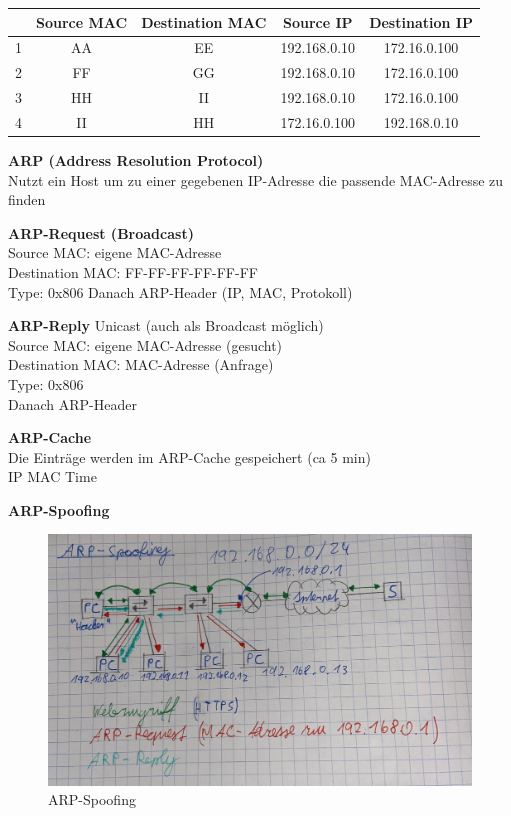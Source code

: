 \begin{table}[H]
	\begin{tabular}{c|cccc}
		& Source MAC & Destination MAC & Source IP & Destination IP \\
		\hline
		1 & AA & EE & 192.168.0.10 & 172.16.0.100 \\
		2 & FF & GG & 192.168.0.10 & 172.16.0.100 \\
		3 & HH & II & 192.168.0.10 & 172.16.0.100 \\
		4 & II & HH & 172.16.0.100 & 192.168.0.10
	\end{tabular}
\end{table}

\textbf{ARP (Address Resolution Protocol)} \\
Nutzt ein Host um zu einer gegebenen IP-Adresse die passende MAC-Adresse zu finden

\textbf{ARP-Request (Broadcast)} \\
Source MAC: eigene MAC-Adresse \\
Destination MAC: FF-FF-FF-FF-FF-FF \\
Type: 0x806
Danach ARP-Header (IP, MAC, Protokoll)

\textbf{ARP-Reply}
Unicast (auch als Broadcast möglich) \\
Source MAC: eigene MAC-Adresse (gesucht) \\
Destination MAC: MAC-Adresse (Anfrage) \\
Type: 0x806 \\
Danach ARP-Header

\textbf{ARP-Cache} \\
Die Einträge werden im ARP-Cache gespeichert (ca 5 min) \\
IP MAC Time

\textbf{ARP-Spoofing}
\begin{figure}[H]
	\centering
	\includegraphics[width=1.0\linewidth]{figures/arpspoofing.jpeg}
	\caption{ARP-Spoofing}
	\label{fig:arpspoofing}
\end{figure}






